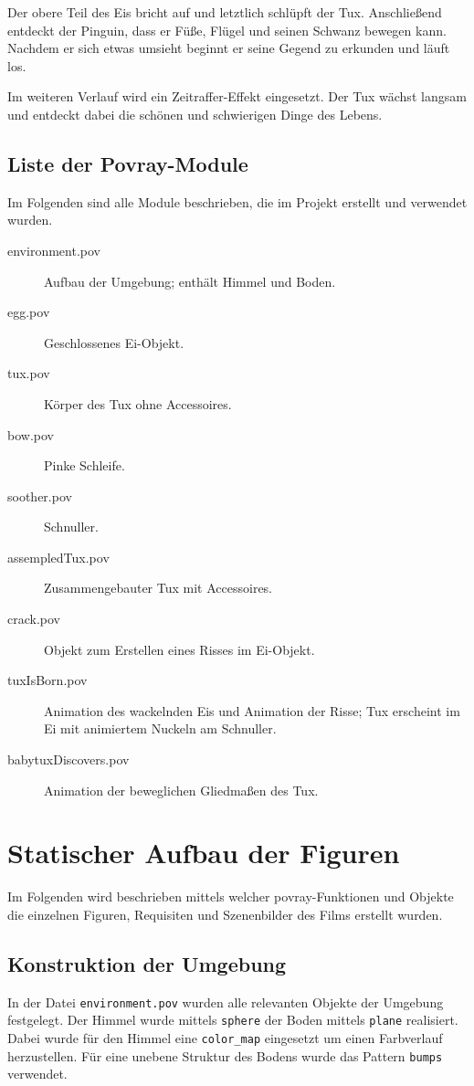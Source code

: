 \documentclass[11pt,parskip]{scrartcl}
\begin{document}
Der obere Teil des Eis bricht auf und letztlich schlüpft der Tux. Anschließend
entdeckt der Pinguin, dass er Füße, Flügel und seinen Schwanz bewegen kann.
Nachdem er sich etwas umsieht beginnt er seine Gegend zu erkunden und läuft
los.

Im weiteren Verlauf wird ein Zeitraffer-Effekt eingesetzt. Der Tux wächst
langsam und entdeckt dabei die schönen und schwierigen Dinge des Lebens.

\subsection{Liste der Povray-Module}

Im Folgenden sind alle Module beschrieben, die im Projekt erstellt und verwendet
wurden.

\begin{description}
  \item [environment.pov] Aufbau der Umgebung; enthält Himmel und Boden.
  \item [egg.pov] Geschlossenes Ei-Objekt.
  \item [tux.pov] Körper des Tux ohne Accessoires.
  \item [bow.pov] Pinke Schleife.
  \item [soother.pov] Schnuller.
  \item [assempledTux.pov] Zusammengebauter Tux mit Accessoires.
  \item [crack.pov] Objekt zum Erstellen eines Risses im Ei-Objekt.
  \item [tuxIsBorn.pov] Animation des wackelnden Eis und Animation der
    Risse; Tux erscheint im Ei mit animiertem Nuckeln am Schnuller.
  \item [babytuxDiscovers.pov] Animation der beweglichen Gliedmaßen des Tux.
\end{description}

\newpage

\section{Statischer Aufbau der Figuren}
Im Folgenden wird beschrieben mittels welcher povray-Funktionen und Objekte die
einzelnen Figuren, Requisiten und Szenenbilder des Films erstellt wurden.


\subsection{Konstruktion der Umgebung}
In der Datei \texttt{environment.pov} wurden alle relevanten Objekte der Umgebung
festgelegt. Der Himmel wurde mittels \texttt{sphere} der Boden mittels
\texttt{plane} realisiert. Dabei wurde für den Himmel eine \texttt{color\_map}
eingesetzt um einen Farbverlauf herzustellen. Für eine unebene Struktur des
Bodens wurde das Pattern \texttt{bumps} verwendet.
\end{document}
